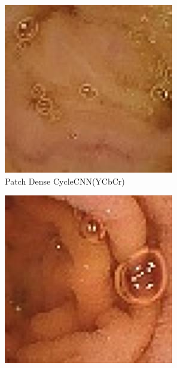\begin{figure}[H]
  \begin{subfigure}[b]{0.32\textwidth}
    \includegraphics[width=\textwidth]{Chapter7/patch_ycbcr_dense_9.jpg}
    \caption{Patch Dense CycleCNN(YCbCr)}
  \end{subfigure}
  \begin{subfigure}[b]{0.32\textwidth}
    \includegraphics[width=\textwidth]{Chapter7/patch_ycbcr_dense_445.jpg}

\end{subfigure}
\end{figure}
